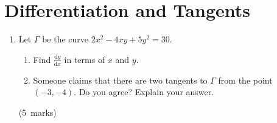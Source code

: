 \documentclass[12pt, a4paper]{article} %
\newcommand{\qmarks}[1]{\leavevmode\unskip\hspace*{\fill}\mbox{(#1 marks)}}
\begin{document}
\section{Differentiation and Tangents}
\begin{enumerate}
    \item Let \(\varGamma\) be the curve \(2x^2-4xy+5y^2=30\).
    \begin{enumerate}\item Find \(\displaystyle \frac{\mathrm{d}y}{\mathrm{d}x}\) in terms of \(x\) and \(y\).
    \item Someone claims that there are two tangents to \(\varGamma\) from the point \((-3,-4)\). Do you agree? Explain your answer.
    \end{enumerate}\qmarks{5}
\end{enumerate}
\newpage
\end{document}
